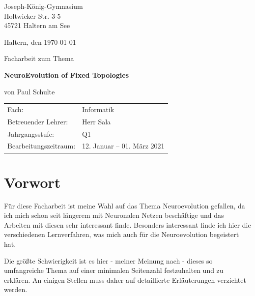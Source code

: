 \documentclass[parskip=half,titlepage]{scrartcl}
\begin{document}
\begin{titlepage}
	\begin{flushleft}
		Joseph-König-Gymnasium\\
		Holtwicker Str. 3-5\\
		45721 Haltern am See\\
\end{flushleft}

\begin{flushright}Haltern, den \today\end{flushright}

\bigskip{}

\begin{center}
	\begin{Large}
		Facharbeit zum Thema 
	\end{Large}
\end{center}

\begin{center}
	\begin{huge}
		\textbf{NeuroEvolution of Fixed Topologies}
	\end{huge}
\end{center}

\begin{center}
	von Paul Schulte
\end{center}

\vfill

\begin{tabular}{ll}
Fach: & Informatik \tabularnewline
Betreuender Lehrer: & Herr Sala \tabularnewline
Jahrgangsstufe: & Q1 \tabularnewline
Bearbeitungszeitraum: & 12. Januar -- 01. März 2021 \tabularnewline
\end{tabular}
\end{titlepage}

\tableofcontents

\clearpage

\section*{Vorwort}
Für diese Facharbeit ist meine Wahl auf das Thema Neuroevolution gefallen, da ich mich schon seit längerem mit Neuronalen Netzen beschäftige und das Arbeiten mit diesen sehr interessant finde. Besonders interessant finde ich hier die verschiedenen Lernverfahren, was mich auch für die Neuroevolution begeistert hat. 

Die größte Schwierigkeit ist es hier - meiner Meinung nach - dieses so umfangreiche Thema auf einer minimalen Seitenzahl festzuhalten und zu erklären. An einigen Stellen muss daher auf detaillierte Erläuterungen verzichtet werden. 
\end{document}
